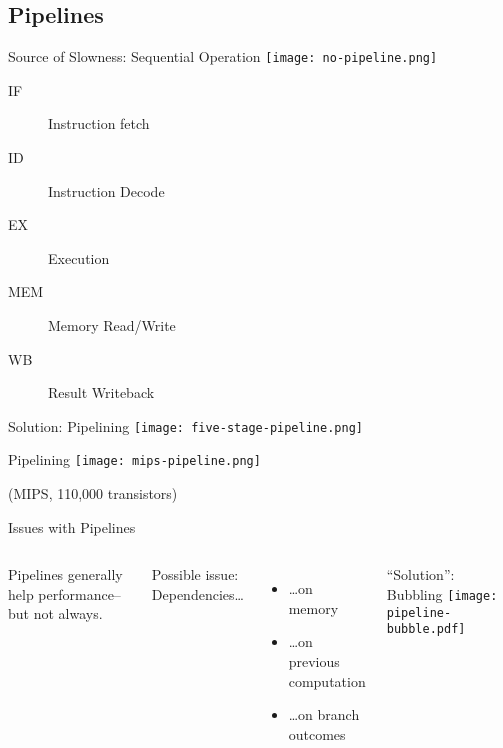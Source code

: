 \documentclass[english,compress]{beamer}
\begin{document}
\subsection{Pipelines}
\begin{frame}{Source of Slowness: Sequential Operation}
  \texttt{[image: no-pipeline.png]}
  \begin{description}
    \item[IF] Instruction fetch
    \item[ID] Instruction Decode
    \item[EX] Execution
    \item[MEM] Memory Read/Write
    \item[WB] Result Writeback
  \end{description}
\end{frame}
\begin{frame}{Solution: Pipelining}
  \texttt{[image: five-stage-pipeline.png]}
\end{frame}
\begin{frame}{Pipelining}
  \texttt{[image: mips-pipeline.png]}

  \small (MIPS, 110,000 transistors)
\end{frame}

\begin{frame}{Issues with Pipelines}
  \begin{columns}
      Pipelines generally help performance--but not always.

      \medskip
      Possible issue: Dependencies\dots
      \begin{itemize}
        \item \dots on memory
        \item \dots on previous computation
        \item \dots on branch outcomes
      \end{itemize}
      ``Solution'': Bubbling
      \texttt{[image: pipeline-bubble.pdf]}
  \end{columns}
\end{frame}
\end{document}

